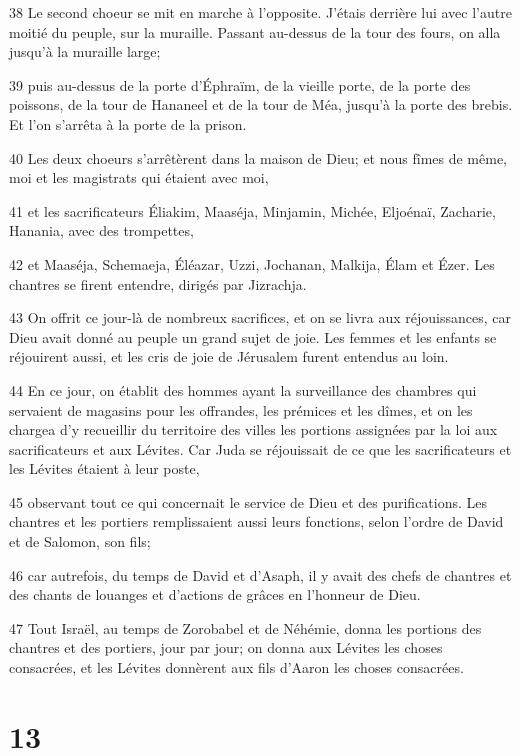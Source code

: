 \par 38 Le second choeur se mit en marche à l'opposite. J'étais derrière lui avec l'autre moitié du peuple, sur la muraille. Passant au-dessus de la tour des fours, on alla jusqu'à la muraille large;
\par 39 puis au-dessus de la porte d'Éphraïm, de la vieille porte, de la porte des poissons, de la tour de Hananeel et de la tour de Méa, jusqu'à la porte des brebis. Et l'on s'arrêta à la porte de la prison.
\par 40 Les deux choeurs s'arrêtèrent dans la maison de Dieu; et nous fîmes de même, moi et les magistrats qui étaient avec moi,
\par 41 et les sacrificateurs Éliakim, Maaséja, Minjamin, Michée, Eljoénaï, Zacharie, Hanania, avec des trompettes,
\par 42 et Maaséja, Schemaeja, Éléazar, Uzzi, Jochanan, Malkija, Élam et Ézer. Les chantres se firent entendre, dirigés par Jizrachja.
\par 43 On offrit ce jour-là de nombreux sacrifices, et on se livra aux réjouissances, car Dieu avait donné au peuple un grand sujet de joie. Les femmes et les enfants se réjouirent aussi, et les cris de joie de Jérusalem furent entendus au loin.
\par 44 En ce jour, on établit des hommes ayant la surveillance des chambres qui servaient de magasins pour les offrandes, les prémices et les dîmes, et on les chargea d'y recueillir du territoire des villes les portions assignées par la loi aux sacrificateurs et aux Lévites. Car Juda se réjouissait de ce que les sacrificateurs et les Lévites étaient à leur poste,
\par 45 observant tout ce qui concernait le service de Dieu et des purifications. Les chantres et les portiers remplissaient aussi leurs fonctions, selon l'ordre de David et de Salomon, son fils;
\par 46 car autrefois, du temps de David et d'Asaph, il y avait des chefs de chantres et des chants de louanges et d'actions de grâces en l'honneur de Dieu.
\par 47 Tout Israël, au temps de Zorobabel et de Néhémie, donna les portions des chantres et des portiers, jour par jour; on donna aux Lévites les choses consacrées, et les Lévites donnèrent aux fils d'Aaron les choses consacrées.

\chapter{13}

